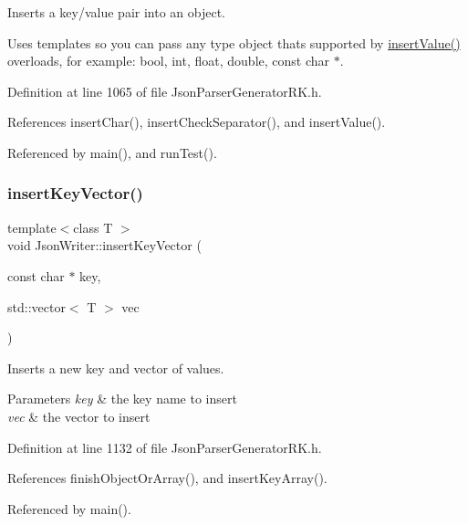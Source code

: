 Inserts a key/value pair into an object. 

Uses templates so you can pass any type object that\textquotesingle{}s supported by \hyperlink{class_json_writer_ac58734c238ba7be066838591b0cc7743}{insert\+Value()} overloads, for example\+: bool, int, float, double, const char $\ast$. 

Definition at line 1065 of file Json\+Parser\+Generator\+R\+K.\+h.



References insert\+Char(), insert\+Check\+Separator(), and insert\+Value().



Referenced by main(), and run\+Test().

\mbox{\label{class_json_writer_a14774145a0fa9b1328c1797f76316d82}} 
\subsubsection{\texorpdfstring{insert\+Key\+Vector()}{insertKeyVector()}}
{\footnotesize\ttfamily template$<$class T $>$ \\
void Json\+Writer\+::insert\+Key\+Vector (\begin{DoxyParamCaption}\item[{const char $\ast$}]{key,  }\item[{std\+::vector$<$ T $>$}]{vec }\end{DoxyParamCaption})\hspace{0.3cm}{\ttfamily [inline]}}



Inserts a new key and vector of values. 


\begin{DoxyParams}{Parameters}
{\em key} & the key name to insert\\
\hline
{\em vec} & the vector to insert \\
\hline
\end{DoxyParams}


Definition at line 1132 of file Json\+Parser\+Generator\+R\+K.\+h.



References finish\+Object\+Or\+Array(), and insert\+Key\+Array().



Referenced by main().

